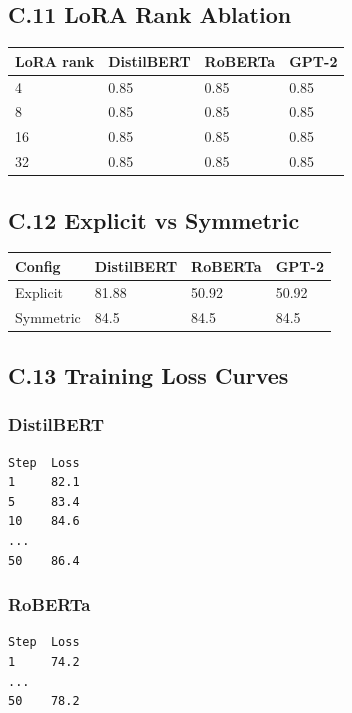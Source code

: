 \subsection{C.11 LoRA Rank Ablation}

\begin{table}[H]
\centering
\small
\begin{tabular}{llll}
\toprule
\textbf{LoRA rank} & \textbf{DistilBERT} & \textbf{RoBERTa} & \textbf{GPT-2} \\
\midrule
4 & 0.85 & 0.85 & 0.85 \\
8 & 0.85 & 0.85 & 0.85 \\
16 & 0.85 & 0.85 & 0.85 \\
32 & 0.85 & 0.85 & 0.85 \\
\bottomrule
\end{tabular}
\end{table}

\subsection{C.12 Explicit vs Symmetric}

\begin{table}[H]
\centering
\small
\begin{tabular}{llll}
\toprule
\textbf{Config} & \textbf{DistilBERT} & \textbf{RoBERTa} & \textbf{GPT-2} \\
\midrule
Explicit & 81.88 & 50.92 & 50.92 \\
Symmetric & 84.5 & 84.5 & 84.5 \\
\bottomrule
\end{tabular}
\end{table}

\subsection{C.13 Training Loss Curves}

\subsubsection{DistilBERT}
\begin{lstlisting}
Step  Loss
1     82.1
5     83.4
10    84.6
...
50    86.4
\end{lstlisting}

\subsubsection{RoBERTa}
\begin{lstlisting}
Step  Loss
1     74.2
...
50    78.2
\end{lstlisting}

